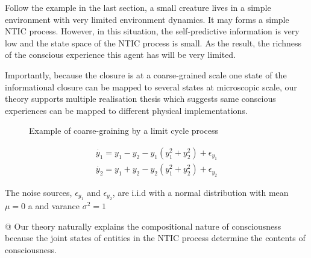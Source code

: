         Follow the example in the last section, a small creature lives in a simple environment with very limited environment dynamics. It may forms a simple NTIC process. However, in this situation, the self-predictive information is very low and the state space of the NTIC process is small. As the result, the richness of the conscious experience this agent has will be very limited. 
        
        Importantly, because the closure is at a coarse-grained scale one state of the informational closure can be mapped to several states at microscopic scale, our theory supports multiple realisation thesis  which suggests same conscious experiences can be mapped to different physical implementations. 
        
		\begin{figure}[H]
			\label{fig:limitCycle}
			\caption{Example of coarse-graining by a limit cycle process}
		\end{figure}
		

		\begin{equation}\label{eq:LimitCycleExample}
            \begin{array}{l}{\dot{y_1}=y_1-y_2-y_1\left(y_1^{2}+y_2^{2} \right)+\epsilon_{y_1}} \\ {\dot{y_2}=y_1+y_2-y_2\left(y_1^{2}+y_2^{2}\right)+\epsilon_{y_2}}\end{array}
		\end{equation}    		
		
		The noise sources, $\epsilon_{y_1}$ and $\epsilon_{y_2}$, are i.i.d with a normal distribution with mean $\mu=0$ a and varance $\sigma^{2}=1$     
		
        
		\begin{WritingMaterials}
            @ Our theory naturally explains the compositional nature of consciousness because the joint states of entities in the NTIC process determine the contents of consciousness.

		\end{WritingMaterials}
			
			
			
